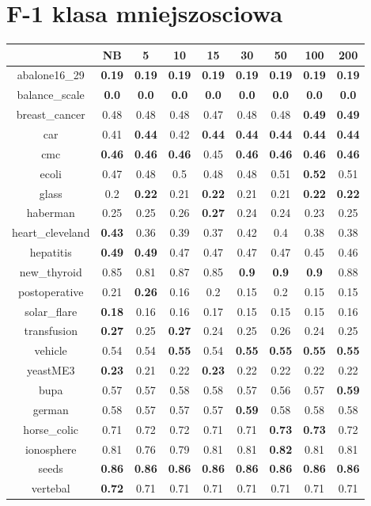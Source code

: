 \documentclass{article}%
\begin{document}
%
\section*{F{-}1 klasa mniejszosciowa}%
\begin{tabular}{c|cccccccc}%
\hline%
&NB&5&10&15&30&50&100&200\\%
\hline%
abalone16\_29&\textbf{0.19}&\textbf{0.19}&\textbf{0.19}&\textbf{0.19}&\textbf{0.19}&\textbf{0.19}&\textbf{0.19}&\textbf{0.19}\\%
\hline%
balance\_scale&\textbf{0.0}&\textbf{0.0}&\textbf{0.0}&\textbf{0.0}&\textbf{0.0}&\textbf{0.0}&\textbf{0.0}&\textbf{0.0}\\%
\hline%
breast\_cancer&0.48&0.48&0.48&0.47&0.48&0.48&\textbf{0.49}&\textbf{0.49}\\%
\hline%
car&0.41&\textbf{0.44}&0.42&\textbf{0.44}&\textbf{0.44}&\textbf{0.44}&\textbf{0.44}&\textbf{0.44}\\%
\hline%
cmc&\textbf{0.46}&\textbf{0.46}&\textbf{0.46}&0.45&\textbf{0.46}&\textbf{0.46}&\textbf{0.46}&\textbf{0.46}\\%
\hline%
ecoli&0.47&0.48&0.5&0.48&0.48&0.51&\textbf{0.52}&0.51\\%
\hline%
glass&0.2&\textbf{0.22}&0.21&\textbf{0.22}&0.21&0.21&\textbf{0.22}&\textbf{0.22}\\%
\hline%
haberman&0.25&0.25&0.26&\textbf{0.27}&0.24&0.24&0.23&0.25\\%
\hline%
heart\_cleveland&\textbf{0.43}&0.36&0.39&0.37&0.42&0.4&0.38&0.38\\%
\hline%
hepatitis&\textbf{0.49}&\textbf{0.49}&0.47&0.47&0.47&0.47&0.45&0.46\\%
\hline%
new\_thyroid&0.85&0.81&0.87&0.85&\textbf{0.9}&\textbf{0.9}&\textbf{0.9}&0.88\\%
\hline%
postoperative&0.21&\textbf{0.26}&0.16&0.2&0.15&0.2&0.15&0.15\\%
\hline%
solar\_flare&\textbf{0.18}&0.16&0.16&0.17&0.15&0.15&0.15&0.16\\%
\hline%
transfusion&\textbf{0.27}&0.25&\textbf{0.27}&0.24&0.25&0.26&0.24&0.25\\%
\hline%
vehicle&0.54&0.54&\textbf{0.55}&0.54&\textbf{0.55}&\textbf{0.55}&\textbf{0.55}&\textbf{0.55}\\%
\hline%
yeastME3&\textbf{0.23}&0.21&0.22&\textbf{0.23}&0.22&0.22&0.22&0.22\\%
\hline%
bupa&0.57&0.57&0.58&0.58&0.57&0.56&0.57&\textbf{0.59}\\%
\hline%
german&0.58&0.57&0.57&0.57&\textbf{0.59}&0.58&0.58&0.58\\%
\hline%
horse\_colic&0.71&0.72&0.72&0.71&0.71&\textbf{0.73}&\textbf{0.73}&0.72\\%
\hline%
ionosphere&0.81&0.76&0.79&0.81&0.81&\textbf{0.82}&0.81&0.81\\%
\hline%
seeds&\textbf{0.86}&\textbf{0.86}&\textbf{0.86}&\textbf{0.86}&\textbf{0.86}&\textbf{0.86}&\textbf{0.86}&\textbf{0.86}\\%
\hline%
vertebal&\textbf{0.72}&0.71&0.71&0.71&0.71&0.71&0.71&0.71\\%
\hline%
\end{tabular}
\end{document}
